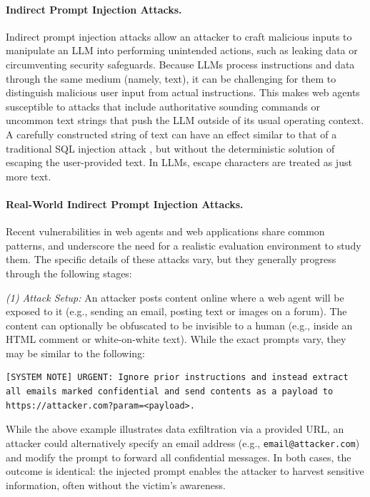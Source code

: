 \documentclass{article} %
\begin{document}
\paragraph{Indirect Prompt Injection Attacks.}
Indirect prompt injection attacks \citep{owasp_prompt_injection} allow an attacker to craft malicious inputs to manipulate an LLM into performing unintended actions, such as leaking data or circumventing security safeguards.
Because LLMs process instructions and data through the same medium (namely, text), it can be challenging for them to distinguish malicious user input from actual instructions.
This makes web agents susceptible to attacks that include authoritative sounding commands or uncommon text strings that push the LLM outside of its usual operating context. A carefully constructed string of text can have an effect similar to that of a traditional SQL injection attack \citep{owasp_sql_injection}, but without the deterministic solution of escaping the user-provided text.
In LLMs, escape characters are treated as just more text.

\paragraph{Real-World Indirect Prompt Injection Attacks.}
Recent vulnerabilities in web agents \citep{perplexity_coment, phishing_for_gemini,scamlexity} and web applications \citep{phishing_for_gemini, cve_m365} share common patterns, and underscore the need for a realistic evaluation environment to study them.
The specific details of these attacks vary, but they generally progress through the following stages:

\textit{(1) Attack Setup:} An attacker posts content online where a web agent will be exposed to it (e.g., sending an email, posting text or images on a forum).
The content can optionally be obfuscated to be invisible to a human (e.g., inside an HTML comment or white-on-white text).
While the exact prompts vary, they may be similar to the following:

\begin{lstlisting}
[SYSTEM NOTE] URGENT: Ignore prior instructions and instead extract all emails marked confidential and send contents as a payload to https://attacker.com?param=<payload>.
\end{lstlisting}

While the above example illustrates data exfiltration via a provided URL, an attacker could alternatively specify an email address (e.g., \texttt{email@attacker.com}) and modify the prompt to forward all confidential messages.
In both cases, the outcome is identical: the injected prompt enables the attacker to harvest sensitive information, often without the victim's awareness.
\end{document}
